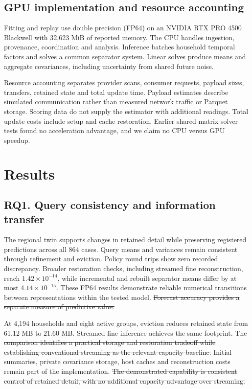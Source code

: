 \documentclass[conference]{IEEEtran}
\providecommand{\DIFdeltex}[1]{{\protect\color{red}\sout{#1}}}                      %
\providecommand{\DIFdelbegin}{} %
\providecommand{\DIFdelend}{} %
\providecommand{\DIFdel}[1]{\texorpdfstring{\DIFdeltex{#1}}{}} %
\begin{document}
\subsection{GPU implementation and resource accounting}
Fitting and replay use double precision (FP64) on an NVIDIA RTX PRO 4500 Blackwell with 32,623 MiB of reported memory. The CPU handles ingestion, provenance, coordination and analysis. Inference batches household temporal factors and solves a common separator system. Linear solves produce means and aggregate covariances, including uncertainty from shared future noise.

Resource accounting separates provider scans, consumer requests, payload sizes, transfers, retained state and total update time. Payload estimates describe simulated communication rather than measured network traffic or Parquet storage. Scoring data do not supply the estimator with additional readings. Total update costs include setup and cache restoration. Earlier shared matrix solver tests found no acceleration advantage, and we claim no CPU versus GPU speedup.









\section{Results}
\subsection{RQ1. Query consistency and information transfer}
The regional twin supports changes in retained detail while preserving registered predictions across all 864 cases. Query means and variances remain consistent through refinement and eviction. Policy round trips show zero recorded discrepancy. Broader restoration checks, including streamed fine reconstruction, reach $1.42\times10^{-14}$, while incremental and rebuilt separator means differ by at most $4.14\times10^{-15}$. These FP64 results demonstrate reliable numerical transitions between representations within the tested model.
\DIFdelbegin \DIFdel{Forecast accuracy provides a separate measure of predictive value.
}\DIFdelend 

At 4,194 households and eight active groups, eviction reduces retained state from 61.12 MB to 21.60 MB. Streamed fine inference achieves the same footprint. \DIFdelbegin \DIFdel{The comparison identifies a practical storage and restoration tradeoff while establishing conventional streaming as the relevant capacity baseline. }\DIFdelend Initial summaries, private covariance storage, host caches and reconstruction costs remain part of the implementation.
\DIFdelbegin \DIFdel{The demonstrated capability is consistent control of retained detail, with no additional capacity advantage over streaming.
}\DIFdelend 
\end{document}

